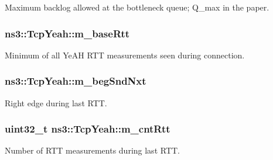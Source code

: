 Maximum backlog allowed at the bottleneck queue; Q\+\_\+max in the paper. 

\subsubsection[{\texorpdfstring{m\+\_\+base\+Rtt}{m_baseRtt}}]{ ns3\+::\+Tcp\+Yeah\+::m\+\_\+base\+Rtt\hspace{0.3cm}{\ttfamily [private]}}\hypertarget{classns3_1_1TcpYeah_ae5be5385c3024374ff24843e70cde080}{}\label{classns3_1_1TcpYeah_ae5be5385c3024374ff24843e70cde080}


Minimum of all Ye\+AH R\+TT measurements seen during connection. 

\subsubsection[{\texorpdfstring{m\+\_\+beg\+Snd\+Nxt}{m_begSndNxt}}]{ ns3\+::\+Tcp\+Yeah\+::m\+\_\+beg\+Snd\+Nxt\hspace{0.3cm}{\ttfamily [private]}}\hypertarget{classns3_1_1TcpYeah_a8e8f91c5e0b2706f00c89d76563e83fb}{}\label{classns3_1_1TcpYeah_a8e8f91c5e0b2706f00c89d76563e83fb}


Right edge during last R\+TT. 

\subsubsection[{\texorpdfstring{m\+\_\+cnt\+Rtt}{m_cntRtt}}]{\setlength{\rightskip}{0pt plus 5cm}uint32\+\_\+t ns3\+::\+Tcp\+Yeah\+::m\+\_\+cnt\+Rtt\hspace{0.3cm}{\ttfamily [private]}}\hypertarget{classns3_1_1TcpYeah_a3040af9006b6237f1c5aa012aba3858a}{}\label{classns3_1_1TcpYeah_a3040af9006b6237f1c5aa012aba3858a}


Number of R\+TT measurements during last R\+TT. 

